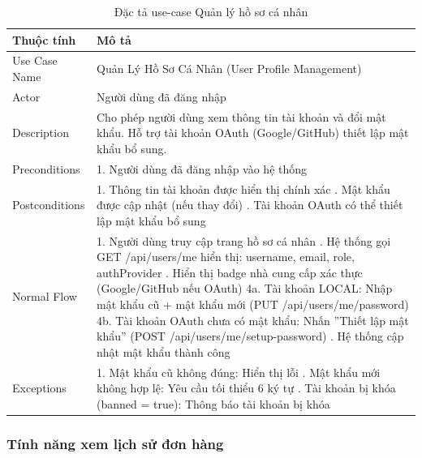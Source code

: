 \begin{table}[H]
\centering
\begin{tabular}{|l|p{11cm}|}
\hline
\textbf{Thuộc tính} & \textbf{Mô tả} \\
\hline
Use Case Name & Quản Lý Hồ Sơ Cá Nhân (User Profile Management) \\
\hline
Actor & Người dùng đã đăng nhập \\
\hline
Description & Cho phép người dùng xem thông tin tài khoản và đổi mật khẩu. Hỗ trợ tài khoản OAuth (Google/GitHub) thiết lập mật khẩu bổ sung. \\
\hline
Preconditions & 1. Người dùng đã đăng nhập vào hệ thống \\
\hline
Postconditions & 1. Thông tin tài khoản được hiển thị chính xác \newline 2. Mật khẩu được cập nhật (nếu thay đổi) \newline 3. Tài khoản OAuth có thể thiết lập mật khẩu bổ sung \\
\hline
Normal Flow & 1. Người dùng truy cập trang hồ sơ cá nhân \newline 2. Hệ thống gọi GET /api/users/me hiển thị: username, email, role, authProvider \newline 3. Hiển thị badge nhà cung cấp xác thực (Google/GitHub nếu OAuth) \newline 4a. Tài khoản LOCAL: Nhập mật khẩu cũ + mật khẩu mới (PUT /api/users/me/password) \newline 4b. Tài khoản OAuth chưa có mật khẩu: Nhấn ''Thiết lập mật khẩu'' (POST /api/users/me/setup-password) \newline 5. Hệ thống cập nhật mật khẩu thành công \\
\hline
Exceptions & 1. Mật khẩu cũ không đúng: Hiển thị lỗi \newline 2. Mật khẩu mới không hợp lệ: Yêu cầu tối thiểu 6 ký tự \newline 3. Tài khoản bị khóa (banned = true): Thông báo tài khoản bị khóa \\
\hline
\end{tabular}
\caption{Đặc tả use-case Quản lý hồ sơ cá nhân}
\label{tab:uc009}
\end{table}

\subsubsection{Tính năng xem lịch sử đơn hàng}

